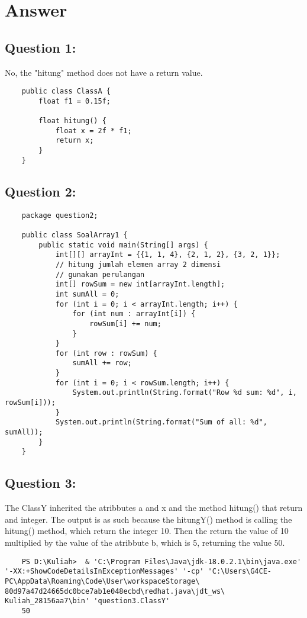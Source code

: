 \documentclass[12pt,titlepage]{article}
\begin{document}
\newpage

\section*{Answer}

\subsection*{Question 1:}
\noindent
No, the "hitung" method does not have a return value.
\begin{verbatim}
    public class ClassA {
        float f1 = 0.15f;

        float hitung() {
            float x = 2f * f1;
            return x;
        }
    }
\end{verbatim}

\subsection*{Question 2:}
\noindent
\begin{verbatim}
    package question2;

    public class SoalArray1 {
        public static void main(String[] args) {
            int[][] arrayInt = {{1, 1, 4}, {2, 1, 2}, {3, 2, 1}};
            // hitung jumlah elemen array 2 dimensi
            // gunakan perulangan
            int[] rowSum = new int[arrayInt.length];
            int sumAll = 0;
            for (int i = 0; i < arrayInt.length; i++) {
                for (int num : arrayInt[i]) {
                    rowSum[i] += num;
                }
            }
            for (int row : rowSum) {
                sumAll += row;
            }
            for (int i = 0; i < rowSum.length; i++) {
                System.out.println(String.format("Row %d sum: %d", i, rowSum[i]));
            }
            System.out.println(String.format("Sum of all: %d", sumAll));
        }
    }
\end{verbatim}

\newpage

\subsection*{Question 3:}
\noindent
The ClassY inherited the atribbutes a and x and the method hitung() that return and integer. The output is as such because the hitungY() method is calling the hitung() method, which return the integer 10. Then the return the value of 10 multiplied by the value of the atribbute b, which is 5, returning the value 50. 
\begin{verbatim}
    PS D:\Kuliah>  & 'C:\Program Files\Java\jdk-18.0.2.1\bin\java.exe' '-XX:+ShowCodeDetailsInExceptionMessages' '-cp' 'C:\Users\G4CE-PC\AppData\Roaming\Code\User\workspaceStorage\ 80d97a47d24665dc0bce7ab1e048ecbd\redhat.java\jdt_ws\ Kuliah_28156aa7\bin' 'question3.ClassY'
    50
\end{verbatim}
\end{document}
